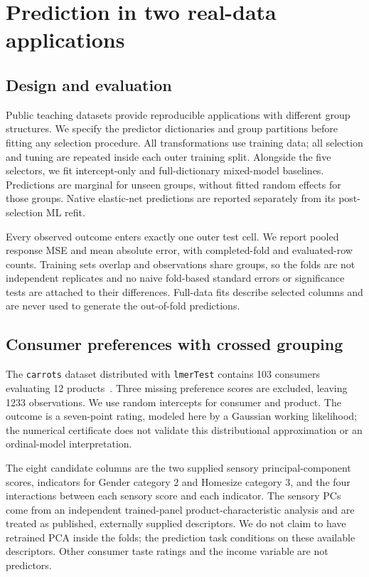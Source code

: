 \documentclass[preprint,11pt,numbers]{elsarticle}
\theoremstyle{remark}\newtheorem{remark}[theorem]{Remark}
\begin{document}
\section{Prediction in two real-data applications}
\subsection{Design and evaluation}
Public teaching datasets provide reproducible applications with different
group structures. We specify the predictor dictionaries and group partitions
before fitting any selection procedure. All transformations use training data;
all selection and tuning are repeated inside each outer training split. Alongside
the five selectors, we fit intercept-only and full-dictionary mixed-model
baselines. Predictions are marginal for unseen groups, without fitted random
effects for those groups. Native elastic-net predictions are reported separately
from its post-selection ML refit.

Every observed outcome enters exactly one outer test cell. We report pooled
response MSE and mean absolute error, with completed-fold and evaluated-row
counts. Training sets overlap and observations share groups, so the folds are
not independent replicates and no naive fold-based standard errors or
significance tests are attached to their differences. Full-data fits describe
selected columns and are never used to generate the out-of-fold predictions.

\subsection{Consumer preferences with crossed grouping}
The \texttt{carrots} dataset distributed with \texttt{lmerTest} contains 103
consumers evaluating 12 products~\cite{lmertestdata}. Three missing preference
scores are excluded, leaving 1233 observations. We use random intercepts for
consumer and product. The outcome is a seven-point rating, modeled here by a
Gaussian working likelihood; the numerical certificate does not validate this
distributional approximation or an ordinal-model interpretation.

The eight candidate columns are the two supplied sensory principal-component
scores, indicators for Gender category 2 and Homesize category 3, and the four
interactions between each sensory score and each indicator. The sensory PCs
come from an independent trained-panel product-characteristic analysis and
are treated as published, externally supplied descriptors. We do not claim to
have retrained PCA inside the folds; the prediction task conditions on these
available descriptors. Other consumer taste ratings and the income variable
are not predictors.
\end{document}
